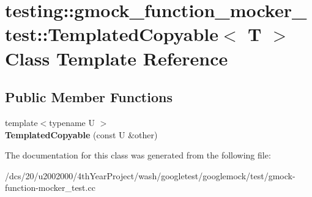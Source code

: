 \hypertarget{classtesting_1_1gmock__function__mocker__test_1_1TemplatedCopyable}{}\section{testing\+:\+:gmock\+\_\+function\+\_\+mocker\+\_\+test\+:\+:Templated\+Copyable$<$ T $>$ Class Template Reference}
\label{classtesting_1_1gmock__function__mocker__test_1_1TemplatedCopyable}
\subsection*{Public Member Functions}
\begin{DoxyCompactItemize}
\item 
\mbox{\label{classtesting_1_1gmock__function__mocker__test_1_1TemplatedCopyable_a8af561a4e372a9a41d4d3b9de6224b42}} 
{\footnotesize template$<$typename U $>$ }\\{\bfseries Templated\+Copyable} (const U \&other)
\end{DoxyCompactItemize}


The documentation for this class was generated from the following file\+:\begin{DoxyCompactItemize}
\item 
/dcs/20/u2002000/4th\+Year\+Project/wash/googletest/googlemock/test/gmock-\/function-\/mocker\+\_\+test.\+cc\end{DoxyCompactItemize}
